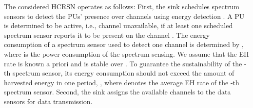 \documentclass[journal]{IEEEtran} \ifCLASSINFOpdf
\begin{document}
The considered HCRSN operates as follows: First, the sink schedules spectrum sensors to detect the PUs' presence over channels using energy detection \cite{Zhang2014}. A PU is determined to be active, i.e., channel unavailable, if at least one scheduled spectrum sensor reports it to be present on the channel \cite{Deng2012}. The energy consumption of a spectrum sensor used to detect one channel is determined by , where  is the power consumption of the spectrum sensing. We assume that the EH rate is known a priori and is stable over  \cite{Zhang2013}. To guarantee the sustainability of the -th spectrum sensor, its energy consumption should not exceed the amount of harvested energy in one period, , where  denotes the average EH rate of the -th spectrum sensor. Second, the sink assigns the available channels to the data sensors for data transmission.
\end{document}
